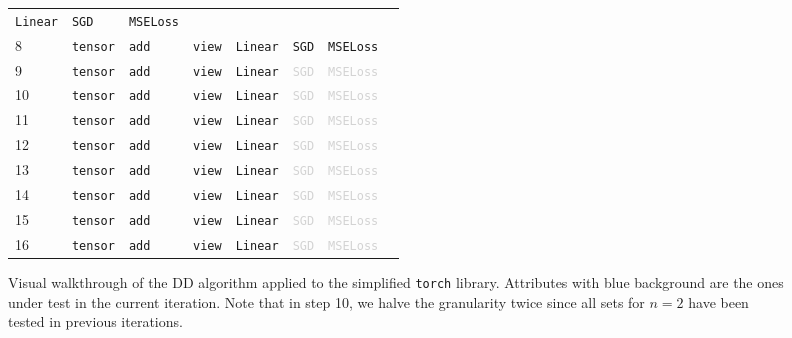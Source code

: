 \documentclass[sigplan,screen]{acmart}
\newcommand{\module}[1]{{\texttt{#1}}}
\newcommand{\cmark}{\color{green}\ding{51}}
\newcommand{\xmark}{\color{red}\ding{55}}
\begin{document}
\begin{figure}[t]
{\begin{tabular}{llllllll}
  \cellcolor[HTML]{DAE8FC}\texttt{Linear} &
  \cellcolor[HTML]{DAE8FC}\texttt{SGD} &
  \cellcolor[HTML]{DAE8FC}\texttt{MSELoss} &
  \xmark \\
8 &
\cellcolor[HTML]{DAE8FC}\texttt{tensor} &
  \cellcolor[HTML]{DAE8FC}\texttt{\texttt{add}} &
  \texttt{view} &
  \texttt{Linear} &
  \cellcolor[HTML]{DAE8FC}\texttt{SGD} &
  \cellcolor[HTML]{DAE8FC}\texttt{MSELoss} &
  \xmark \\
9 &
\cellcolor[HTML]{DAE8FC}\texttt{tensor} &
  \cellcolor[HTML]{DAE8FC}\texttt{add} &
  \cellcolor[HTML]{DAE8FC}\texttt{view} &
  \cellcolor[HTML]{DAE8FC}\texttt{Linear} &
  \textcolor{lightgray}{\texttt{SGD}} &
  \textcolor{lightgray}{\texttt{MSELoss}} &
  \cmark \\
10 &
\cellcolor[HTML]{DAE8FC}\texttt{tensor} &
  \texttt{add} &
  \texttt{view} &
  \texttt{Linear} &
  \textcolor{lightgray}{\texttt{SGD}} &
  \textcolor{lightgray}{\texttt{MSELoss}} &
  \xmark \\
11 &
\texttt{tensor} &
  \cellcolor[HTML]{DAE8FC}\texttt{add} &
  \texttt{view} &
  \texttt{Linear} &
  \textcolor{lightgray}{\texttt{SGD}} &
  \textcolor{lightgray}{\texttt{MSELoss}} &
  \xmark \\
12 &
\texttt{tensor} &
  \texttt{add} &
  \cellcolor[HTML]{DAE8FC}\texttt{view} &
  \texttt{Linear} &
  \textcolor{lightgray}{\texttt{SGD}} &
  \textcolor{lightgray}{\texttt{MSELoss}} &
  \xmark \\
13 &
\texttt{tensor} &
  \texttt{add} &
  \texttt{view} &
  \cellcolor[HTML]{DAE8FC}\texttt{Linear} &
  \textcolor{lightgray}{\texttt{SGD}} &
  \textcolor{lightgray}{\texttt{MSELoss}} &
  \xmark \\
14 &
\texttt{tensor} &
  \cellcolor[HTML]{DAE8FC}\texttt{add} &
  \cellcolor[HTML]{DAE8FC}\texttt{view} &
  \cellcolor[HTML]{DAE8FC}\texttt{Linear} &
  \textcolor{lightgray}{\texttt{SGD}} &
  \textcolor{lightgray}{\texttt{MSELoss}} &
  \xmark \\
15 &
\cellcolor[HTML]{DAE8FC}\texttt{tensor} &
  \texttt{add} &
  \cellcolor[HTML]{DAE8FC}\texttt{view} &
  \cellcolor[HTML]{DAE8FC}\texttt{Linear} &
  \textcolor{lightgray}{\texttt{SGD}} &
  \textcolor{lightgray}{\texttt{MSELoss}} &
  \xmark \\
16 &
\cellcolor[HTML]{DAE8FC}\texttt{tensor} &
  \cellcolor[HTML]{DAE8FC}\texttt{add} &
  \texttt{view} &
  \cellcolor[HTML]{DAE8FC}\texttt{Linear} &
  \textcolor{lightgray}{\texttt{SGD}} &
  \textcolor{lightgray}{\texttt{MSELoss}} &
  \xmark
\end{tabular}} \caption{Visual walkthrough of the DD algorithm applied to the simplified \module{torch} library.
    Attributes with \colorbox[HTML]{DAE8FC}{blue} background are the ones under test in the current iteration.
    Note that in step 10, we halve the granularity twice since all sets for $n=2$ have been tested in previous iterations.}
\label{fig:dd-visual}
\end{figure}
\end{document}
